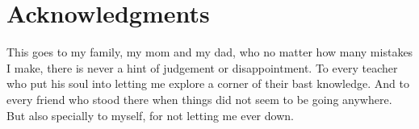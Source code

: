 \chapter*{Acknowledgments}
%

This goes to my family, my mom and my dad, who no matter how many mistakes I make, there is never a hint of judgement or disappointment. To every teacher who put his soul into letting me explore a corner of their bast knowledge. And to every friend who stood there when things did not seem to be going anywhere. But also specially to myself, for not letting me ever down.